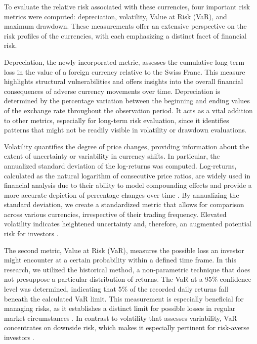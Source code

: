 \documentclass[11pt,a4paper,english,oneside]{book}
\begin{document}
To evaluate the relative risk associated with these currencies, four important risk metrics were computed: depreciation, volatility, Value at Risk (VaR), and maximum drawdown. These measurements offer an extensive perspective on the risk profiles of the currencies, with each emphasizing a distinct facet of financial risk.

Depreciation, the newly incorporated metric, assesses the cumulative long-term loss in the value of a foreign currency relative to the Swiss Franc. This measure highlights structural vulnerabilities and offers insights into the overall financial consequences of adverse currency movements over time. Depreciation is determined by the percentage variation between the beginning and ending values of the exchange rate throughout the observation period. It acts as a vital addition to other metrics, especially for long-term risk evaluation, since it identifies patterns that might not be readily visible in volatility or drawdown evaluations.

Volatility quantifies the degree of price changes, providing information about the extent of uncertainty or variability in currency shifts. In particular, the annualized standard deviation of the log-returns was computed. Log-returns, calculated as the natural logarithm of consecutive price ratios, are widely used in financial analysis due to their ability to model compounding effects and provide a more accurate depiction of percentage changes over time \parencite{scrucca2024entropy}. By annualizing the standard deviation, we create a standardized metric that allows for comparison across various currencies, irrespective of their trading frequency. Elevated volatility indicates heightened uncertainty and, therefore, an augmented potential risk for investors \parencite{kongsilp2017volatility}.

The second metric, Value at Risk (VaR), measures the possible loss an investor might encounter at a certain probability within a defined time frame. In this research, we utilized the historical method, a non-parametric technique that does not presuppose a particular distribution of returns. The VaR at a 95\% confidence level was determined, indicating that 5\% of the recorded daily returns fall beneath the calculated VaR limit. This measurement is especially beneficial for managing risks, as it establishes a distinct limit for possible losses in regular market circumstances \parencite{manganelli2001value}. In contrast to volatility that assesses variability, VaR concentrates on downside risk, which makes it especially pertinent for risk-averse investors \parencite{artzner1999coherent}.
\end{document}

